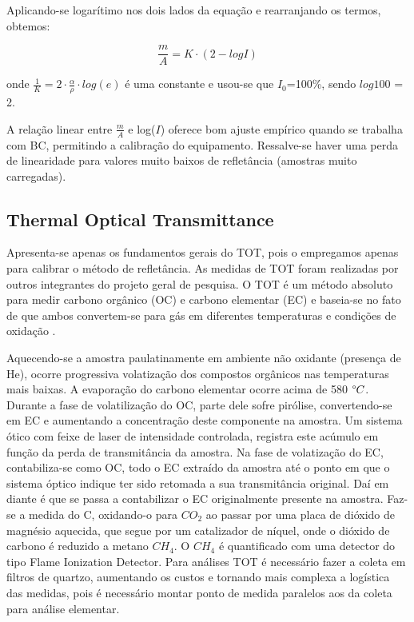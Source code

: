 Aplicando-se logarítimo nos dois lados da equação e rearranjando os termos, 
obtemos:

\begin{equation}
  \label{m/a_2}
  \frac{m}{A} = K \cdot (2-logI) 
\end{equation}

onde $\frac{1}{K} = 2 \cdot \frac{\alpha}{\rho} \cdot log(e)$
é uma constante e usou-se que $I_0$=100\%, sendo $log 100$ = 2.

A relação linear entre $\frac{m}{A}$ e log($I$) oferece bom ajuste empírico 
quando se trabalha com BC, permitindo a calibração do equipamento. 
Ressalve-se haver uma perda de linearidade para valores muito baixos de 
refletância (amostras muito carregadas).  

\subsection{Thermal Optical Transmittance}

Apresenta-se apenas os fundamentos gerais do TOT, pois o empregamos apenas para
calibrar o método de refletância. As medidas de TOT foram realizadas por outros
integrantes do projeto geral de pesquisa.
O TOT é um método absoluto para medir carbono orgânico (OC) e 
carbono elementar (EC) e baseia-se no fato de que ambos convertem-se para gás 
em diferentes temperaturas e condições de oxidação \citep{birch1998}.

Aquecendo-se a amostra paulatinamente em ambiente não oxidante (presença de He),
ocorre progressiva volatização dos compostos orgânicos nas temperaturas mais 
baixas. A evaporação do carbono elementar ocorre acima de 580 $\degree C$.
Durante a fase de volatilização do OC, parte dele sofre pirólise, 
convertendo-se em EC e aumentando a concentração deste componente na amostra. 
Um sistema ótico com feixe de laser de intensidade controlada, registra este 
acúmulo em função da perda de transmitância da amostra.
Na fase de volatização do EC, contabiliza-se como OC, todo o EC extraído da 
amostra até o ponto em que o sistema óptico indique ter sido retomada a sua 
transmitância original. Daí em diante é que se passa a contabilizar o EC 
originalmente presente na amostra.
Faz-se a medida do C, oxidando-o para $CO_2$ ao passar por uma placa de dióxido
de magnésio aquecida, que segue por um catalizador de níquel, 
onde o dióxido de carbono é reduzido a metano $CH_4$. O $CH_4$ é quantificado 
com uma detector do tipo Flame Ionization Detector.
Para análises TOT é necessário fazer a coleta em filtros de quartzo, aumentando 
os custos e tornando mais complexa a logística das medidas, 
pois é necessário montar ponto de medida paralelos aos da coleta para análise
elementar.
